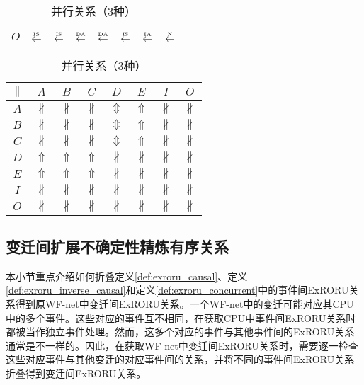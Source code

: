 \begin{table}[htbp]
\begin{subtable}{0.45\textwidth}
\begin{tabular}{|c|c|c|c|c|c|c|c|}
		$O$ & $\overset{\text{\tiny{IS}}}{\leftarrow}$ & $\overset{\text{\tiny{IS}}}{\leftarrow}$ & $\overset{\text{\tiny{DA}}}{\leftarrow}$ & $\overset{\text{\tiny{DA}}}{\leftarrow}$ & $\overset{\text{\tiny{IS}}}{\leftarrow}$ & $\overset{\text{\tiny{IA}}}{\leftarrow}$ & $\overset{\text{\tiny{N}}}{\leftarrow}$\\ \hline
	\end{tabular}
  \end{subtable}
  \begin{subtable}{\textwidth}
  	\vspace{1em}
    \centering
    \caption{并行关系（3种）}
	\begin{tabular}{|c|c|c|c|c|c|c|c|} \hline
		$\parallel$ & $A$ & $B$ & $C$ & $D$ & $E$ & $I$ & $O$\\ \hline
		$A$ & $\nparallel$ & $\nparallel$ & $\nparallel$ & $\Updownarrow$ & $\Uparrow$ & $\nparallel$ & $\nparallel$\\ \hline
		$B$ & $\nparallel$ & $\nparallel$ & $\nparallel$ & $\Updownarrow$ & $\Uparrow$ & $\nparallel$ & $\nparallel$\\ \hline
		$C$ & $\nparallel$ & $\nparallel$ & $\nparallel$ & $\Updownarrow$ & $\Uparrow$ & $\nparallel$ & $\nparallel$\\ \hline
		$D$ & $\Uparrow$ & $\Uparrow$ & $\Uparrow$ & $\nparallel$ & $\nparallel$ & $\nparallel$ & $\nparallel$\\ \hline
		$E$ & $\Uparrow$ & $\Uparrow$ & $\Uparrow$ & $\nparallel$ & $\nparallel$ & $\nparallel$ & $\nparallel$\\ \hline
		$I$ & $\nparallel$ & $\nparallel$ & $\nparallel$ & $\nparallel$ & $\nparallel$ & $\nparallel$ & $\nparallel$\\ \hline
		$O$ & $\nparallel$ & $\nparallel$ & $\nparallel$ & $\nparallel$ & $\nparallel$ & $\nparallel$ & $\nparallel$\\ \hline
	\end{tabular}
  \end{subtable}
\end{table}

\subsection{变迁间扩展不确定性精炼有序关系}\label{subsec:exroru_transition}
本小节重点介绍如何折叠定义\ref{def:exroru_causal}、定义\ref{def:exroru_inverse_causal}和定义\ref{def:exroru_concurrent}中的事件间ExRORU关系得到原WF-net中变迁间ExRORU关系。一个WF-net中的变迁可能对应其CPU中的多个事件。这些对应的事件互不相同，在获取CPU中事件间ExRORU关系时都被当作独立事件处理。然而，这多个对应的事件与其他事件间的ExRORU关系通常是不一样的。因此，在获取WF-net中变迁间ExRORU关系时，需要逐一检查这些对应事件与其他变迁的对应事件间的关系，并将不同的事件间ExRORU关系折叠得到变迁间ExRORU关系。

